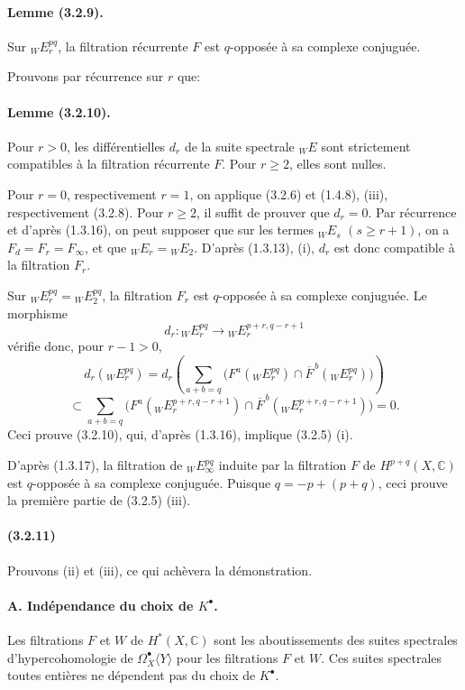 \documentclass[10pt]{article}
\newcommand{\C}{\mathbb C}
\begin{document}
\paragraph{Lemme (3.2.9).} Sur ${}_WE_r^{pq}$, la filtration récurrente $F$ est $q$-opposée à sa complexe conjuguée.

Prouvons par récurrence sur $r$ que:

\paragraph{Lemme (3.2.10).} Pour $r>0$, les différentielles $d_r$ de la suite spectrale ${}_WE$ sont strictement compatibles à la filtration récurrente $F$. Pour $r\ge2$, elles sont nulles.

Pour $r=0$, respectivement $r=1$, on applique (3.2.6) et (1.4.8), (iii), respectivement (3.2.8). Pour $r\ge2$, il suffit de prouver que $d_r=0$. Par récurrence et d'après (1.3.16), on peut supposer que sur les termes ${}_WE_s$ $(s\ge r+1)$, on a $F_d=F_r=F_\infty$, et que ${}_WE_r={}_WE_2$. D'après (1.3.13), (i), $d_r$ est donc compatible à la filtration $F_r$.

Sur ${}_WE_r^{pq}={}_WE_2^{pq}$, la filtration $F_r$ est $q$-opposée à sa complexe conjuguée. Le morphisme
\[
d_r:{}_W E_r^{pq}\longrightarrow {}_W E_r^{p+r,q-r+1}
\]
vérifie donc, pour $r-1>0$,
\[
d_r({}_W E_r^{pq})
=d_r\!\left(\sum_{a+b=q}\bigl(F^a({}_W E_r^{pq})\cap
\overline F^{\,b}({}_W E_r^{pq})\bigr)\right)
\]
\[
\subset
\sum_{a+b=q}\bigl(F^a({}_WE_r^{p+r,q-r+1})\cap
\overline F^{\,b}({}_WE_r^{p+r,q-r+1})\bigr)=0.
\]
Ceci prouve (3.2.10), qui, d'après (1.3.16), implique (3.2.5) (i).

D'après (1.3.17), la filtration de ${}_WE_\infty^{pq}$ induite par la filtration $F$ de $H^{p+q}(X,\C)$ est $q$-opposée à sa complexe conjuguée. Puisque $q=-p+(p+q)$, ceci prouve la première partie de (3.2.5) (iii).

\paragraph{(3.2.11)} Prouvons (ii) et (iii), ce qui achèvera la démonstration.

\paragraph{A. Indépendance du choix de $K^\bullet$.} Les filtrations $F$ et $W$ de $H^*(X,\C)$ sont les aboutissements des suites spectrales d'hypercohomologie de $\Omega_{\overline X}^{\bullet}\langle Y\rangle$ pour les filtrations $F$ et $W$. Ces suites spectrales toutes entières ne dépendent pas du choix de $K^\bullet$.
\end{document}
